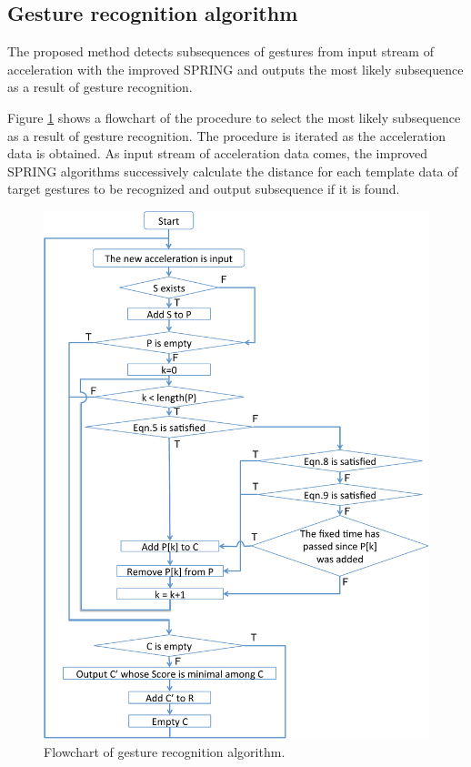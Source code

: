 \documentclass{sigchi-ext}
\begin{document}
       
        \subsection{Gesture recognition algorithm}
        The proposed method detects subsequences of gestures from input stream of acceleration with the improved SPRING and outputs the most likely subsequence as a result of gesture recognition.
        
        Figure \ref{fig:gesture-selection-flowchart} shows a flowchart of the procedure to select the most likely subsequence as a result of gesture recognition. The procedure is iterated as the acceleration data is obtained. As input stream of acceleration data comes, the improved SPRING algorithms successively calculate the distance for each template data of target gestures to be recognized and output subsequence if it is found.
        
        \begin{figure}[!t]
            \centering
            \includegraphics[width=1\linewidth]{images/gesture-detection-flowchart.pdf}
            \caption{Flowchart of gesture recognition algorithm.}
            \label{fig:gesture-selection-flowchart}
        \end{figure}
        
\end{document}
